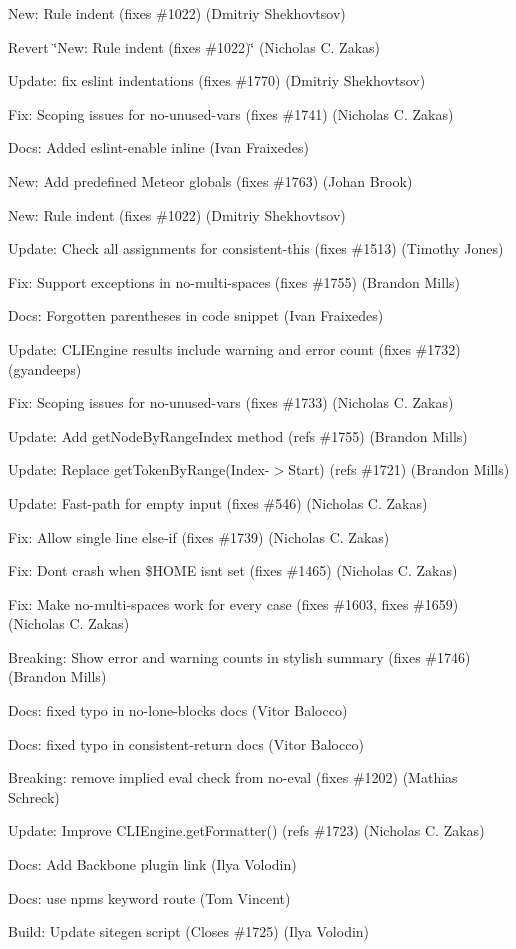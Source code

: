 \begin{DoxyItemize}
\item New\+: Rule indent (fixes \#1022) (Dmitriy Shekhovtsov)
\item Revert \char`\"{}\+New\+: Rule indent (fixes \#1022)\char`\"{} (Nicholas C. Zakas)
\item Update\+: fix eslint indentations (fixes \#1770) (Dmitriy Shekhovtsov)
\item Fix\+: Scoping issues for no-\/unused-\/vars (fixes \#1741) (Nicholas C. Zakas)
\item Docs\+: Added {\ttfamily eslint-\/enable} inline (Ivan Fraixedes)
\item New\+: Add predefined Meteor globals (fixes \#1763) (Johan Brook)
\item New\+: Rule indent (fixes \#1022) (Dmitriy Shekhovtsov)
\item Update\+: Check all assignments for consistent-\/this (fixes \#1513) (Timothy Jones)
\item Fix\+: Support exceptions in no-\/multi-\/spaces (fixes \#1755) (Brandon Mills)
\item Docs\+: Forgotten parentheses in code snippet (Ivan Fraixedes)
\item Update\+: C\+L\+I\+Engine results include warning and error count (fixes \#1732) (gyandeeps)
\item Fix\+: Scoping issues for no-\/unused-\/vars (fixes \#1733) (Nicholas C. Zakas)
\item Update\+: Add get\+Node\+By\+Range\+Index method (refs \#1755) (Brandon Mills)
\item Update\+: Replace get\+Token\+By\+Range(Index-\/$>$Start) (refs \#1721) (Brandon Mills)
\item Update\+: Fast-\/path for empty input (fixes \#546) (Nicholas C. Zakas)
\item Fix\+: Allow single line else-\/if (fixes \#1739) (Nicholas C. Zakas)
\item Fix\+: Don\textquotesingle{}t crash when \$\+H\+O\+ME isn\textquotesingle{}t set (fixes \#1465) (Nicholas C. Zakas)
\item Fix\+: Make no-\/multi-\/spaces work for every case (fixes \#1603, fixes \#1659) (Nicholas C. Zakas)
\item Breaking\+: Show error and warning counts in stylish summary (fixes \#1746) (Brandon Mills)
\item Docs\+: fixed typo in no-\/lone-\/blocks docs (Vitor Balocco)
\item Docs\+: fixed typo in consistent-\/return docs (Vitor Balocco)
\item Breaking\+: remove implied eval check from no-\/eval (fixes \#1202) (Mathias Schreck)
\item Update\+: Improve C\+L\+I\+Engine.\+get\+Formatter() (refs \#1723) (Nicholas C. Zakas)
\item Docs\+: Add Backbone plugin link (Ilya Volodin)
\item Docs\+: use npm\textquotesingle{}s keyword route (Tom Vincent)
\item Build\+: Update sitegen script (Closes \#1725) (Ilya Volodin)
\end{DoxyItemize}


